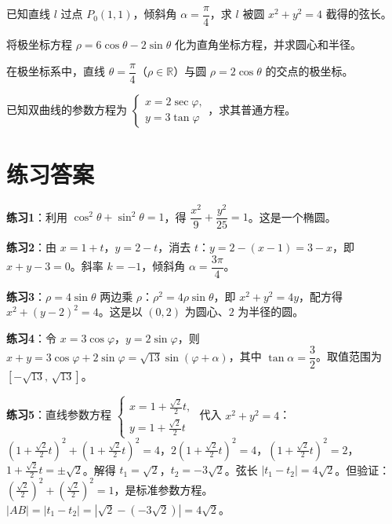 \documentclass[12pt,a4paper]{ctexart}
\theoremstyle{definition}
\begin{document}
\begin{practice}[\textsf{练习5}]
  已知直线 $l$ 过点 $P_0(1,1)$，倾斜角 $\alpha=\dfrac{\pi}{4}$，求 $l$ 被圆 $x^2+y^2=4$ 截得的弦长。
\end{practice}

\begin{practice}[\textsf{练习6}]
  将极坐标方程 $\rho = 6\cos\theta - 2\sin\theta$ 化为直角坐标方程，并求圆心和半径。
\end{practice}

\begin{practice}[\textsf{练习7}]
  在极坐标系中，直线 $\theta=\dfrac{\pi}{4}$（$\rho\in\mathbb{R}$）与圆 $\rho=2\cos\theta$ 的交点的极坐标。
\end{practice}

\begin{practice}[\textsf{练习8}]
  已知双曲线的参数方程为 $\begin{cases} x = 2\sec\varphi, \\ y = 3\tan\varphi \end{cases}$，求其普通方程。
\end{practice}

\newpage
\section{练习答案}

\textbf{练习1}：利用 $\cos^2\theta+\sin^2\theta=1$，得 $\dfrac{x^2}{9}+\dfrac{y^2}{25}=1$。这是一个椭圆。

\medskip

\textbf{练习2}：由 $x=1+t$，$y=2-t$，消去 $t$：$y=2-(x-1)=3-x$，即 $x+y-3=0$。斜率 $k=-1$，倾斜角 $\alpha=\dfrac{3\pi}{4}$。

\medskip

\textbf{练习3}：$\rho=4\sin\theta$ 两边乘 $\rho$：$\rho^2=4\rho\sin\theta$，即 $x^2+y^2=4y$，配方得 $x^2+(y-2)^2=4$。这是以 $(0,2)$ 为圆心、$2$ 为半径的圆。

\medskip

\textbf{练习4}：令 $x=3\cos\varphi$，$y=2\sin\varphi$，则 $x+y=3\cos\varphi+2\sin\varphi=\sqrt{13}\sin(\varphi+\alpha)$，其中 $\tan\alpha=\dfrac{3}{2}$。取值范围为 $[-\sqrt{13},\,\sqrt{13}]$。

\medskip

\textbf{练习5}：直线参数方程 $\begin{cases} x=1+\frac{\sqrt{2}}{2}t, \\ y=1+\frac{\sqrt{2}}{2}t \end{cases}$ 代入 $x^2+y^2=4$：$\left(1+\frac{\sqrt{2}}{2}t\right)^2+\left(1+\frac{\sqrt{2}}{2}t\right)^2=4$，$2\left(1+\frac{\sqrt{2}}{2}t\right)^2=4$，$\left(1+\frac{\sqrt{2}}{2}t\right)^2=2$，$1+\frac{\sqrt{2}}{2}t=\pm\sqrt{2}$。解得 $t_1=\sqrt{2}$，$t_2=-3\sqrt{2}$。弦长 $|t_1-t_2|=4\sqrt{2}$。但验证：$\left(\frac{\sqrt{2}}{2}\right)^2+\left(\frac{\sqrt{2}}{2}\right)^2=1$，是标准参数方程。$|AB|=|t_1-t_2|=|\sqrt{2}-(-3\sqrt{2})|=4\sqrt{2}$。
\end{document}
